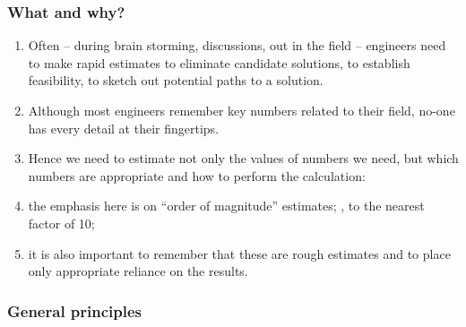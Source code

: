 \subsubsection{What and why?}
%
\begin{enumerate}
\item Often -- during brain storming, discussions, out in the field -- engineers need to make rapid estimates to eliminate candidate solutions, to establish feasibility, to sketch out potential paths to a solution.
%
\item Although most engineers remember key numbers related to their field, no-one has every detail at their fingertips.
%
\item Hence we need to estimate not only the values of numbers we need, but which numbers are appropriate and how to perform the calculation:
%
\item the emphasis here is on ``order of magnitude'' estimates; \ie, to the nearest factor of 10;
%
\item it is also important to remember that these are rough estimates and to place only appropriate reliance on the results.
\end{enumerate}


\subsubsection{General principles}

